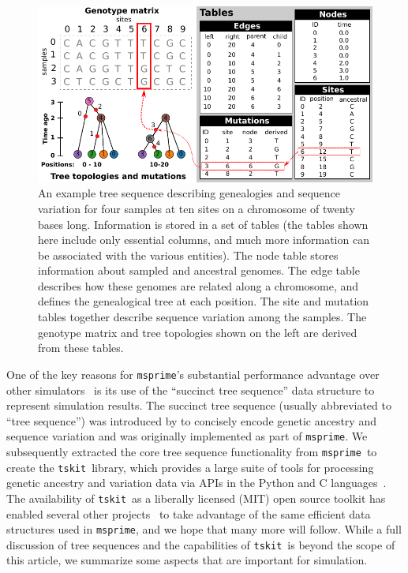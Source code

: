 \documentclass[9pt,twocolumn,twoside,lineno]{gsajnl}
\newcommand{\msprime}[0]{\texttt{msprime}}
\newcommand{\tskit}[0]{\texttt{tskit}}
\begin{document}
\begin{figure}
\begin{center}
\includegraphics{illustrations/example_tree_sequence}
\end{center}
\caption{\label{fig-ts-example} An example tree sequence describing
genealogies and sequence variation for four samples at ten sites
on a chromosome of twenty bases long.
Information is stored in a set of tables
(the tables shown here include only essential columns, and
much more information can be associated with the various entities).
The node table
stores information about sampled and ancestral genomes. The
edge table describes how these genomes are related along a
chromosome, and defines the genealogical tree at each position.
The site and mutation tables together describe sequence variation
among the samples. The genotype matrix and tree topologies shown
on the left are derived from these tables.
}
\end{figure}

One of the key reasons for \msprime's substantial performance advantage
over other simulators~\citep{kelleher2016efficient}
is its use of the ``succinct tree sequence''
data structure to represent simulation results.
The succinct tree sequence (usually abbreviated to ``tree sequence'')
was introduced by \cite{kelleher2016efficient}
to concisely encode genetic ancestry and sequence variation
and was originally implemented as part of \msprime.
We subsequently extracted the core tree sequence functionality
from \msprime\ to create the \tskit\ library,
which provides a large suite of tools for processing genetic ancestry
and variation data via APIs
in the Python and C languages~\citep{tskit2021tskit}.
The availability of \tskit\ as a liberally licensed (MIT) open source
toolkit has enabled several other
projects~\citep[e.g.][]{kelleher2019inferring,haller2019slim,wohns2021unified,
de2021geonomics} to take advantage
of the same efficient data structures used in \msprime,
and we hope that many more will follow.
While a full discussion of tree sequences and the capabilities
of \tskit\ is beyond the scope of this article, we summarize
some aspects that are important for simulation.
\end{document}
